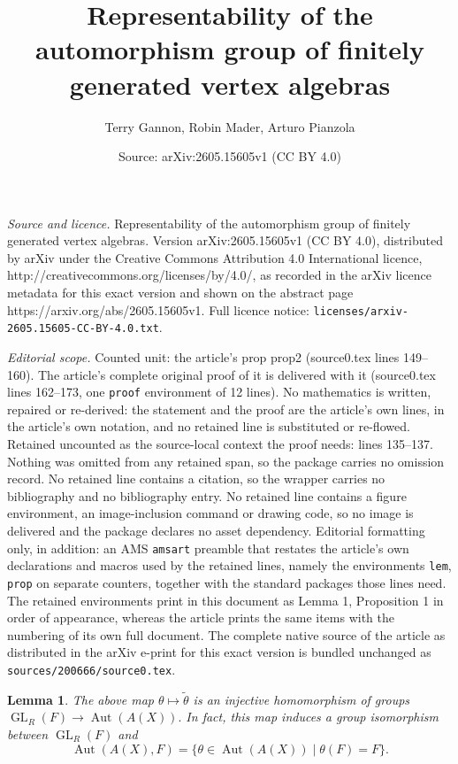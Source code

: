 \documentclass[10pt,a4paper]{amsart}
\title{Representability of the automorphism group of finitely generated vertex algebras}
\author{Terry Gannon, Robin Mader, Arturo Pianzola}
\date{Source: arXiv:2605.15605v1 (CC BY 4.0)}
\newtheorem{lem}{Lemma}
\def\Aut{\ensuremath{\operatorname{Aut}}}
\def\GL{\ensuremath{\operatorname{GL}}}
\begin{document}
\maketitle

\noindent\emph{Source and licence.} Representability of the automorphism group of finitely generated vertex algebras. Version arXiv:2605.15605v1 (CC BY 4.0), distributed by arXiv under the Creative Commons Attribution 4.0 International licence, http://creativecommons.org/licenses/by/4.0/, as recorded in the arXiv licence metadata for this exact version and shown on the abstract page https://arxiv.org/abs/2605.15605v1. Full licence notice: \texttt{licenses/arxiv-2605.15605-CC-BY-4.0.txt}.\par\smallskip

\noindent\textit{Editorial scope.} Counted unit: the article's prop prop2 (source0.tex lines 149--160). The article's complete original proof of it is delivered with it (source0.tex lines 162--173, one \texttt{proof} environment of 12 lines). No mathematics is written, repaired or re-derived: the statement and the proof are the article's own lines, in the article's own notation, and no retained line is substituted or re-flowed.  Retained uncounted as the source-local context the proof needs: lines 135--137.  Nothing was omitted from any retained span, so the package carries no omission record.  No retained line contains a citation, so the wrapper carries no bibliography and no bibliography entry.  No retained line contains a figure environment, an image-inclusion command or drawing code, so no image is delivered and the package declares no asset dependency.  Editorial formatting only, in addition: an AMS \texttt{amsart} preamble that restates the article's own declarations and macros used by the retained lines, namely the environments \texttt{lem}, \texttt{prop} on separate counters, together with the standard packages those lines need.  The retained environments print in this document as Lemma 1, Proposition 1 in order of appearance, whereas the article prints the same items with the numbering of its own full document.  The complete native source of the article as distributed in the arXiv e-print for this exact version is bundled unchanged as \texttt{sources/200666/source0.tex}.
\begin{lem}\label{Lemma1}
		The above map $ \theta \mapsto \widetilde \theta$ is an injective homomorphism of groups $ \GL_R(F) \to \Aut (A(X)).$ In fact, this map induces a group isomorphism between $\GL_R(F)$ and  \[ \Aut(A(X),F) = \{ \theta \in \Aut(A(X)) \mid \theta(F) = F\}.\] 	
\end{lem}
\end{document}

